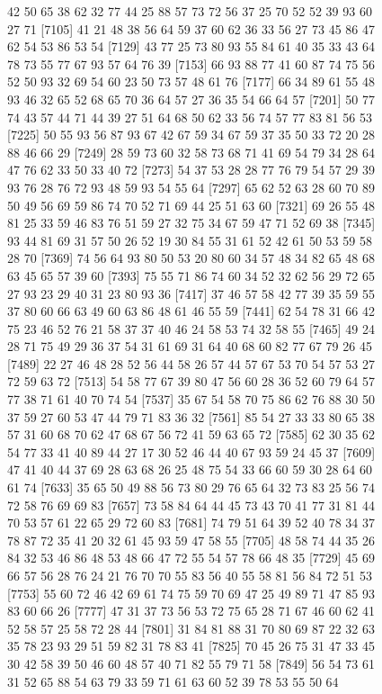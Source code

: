 \documentclass{article}
\begin{document}
\begin{figure}[H]
\begin{Schunk}
\begin{Soutput}
 [7081] 42 50 65 38 62 32 77 44 25 88 57 73 72 56 37 25 70 52 52 39 93 60 27 71
 [7105] 41 21 48 38 56 64 59 37 60 62 36 33 56 27 73 45 86 47 62 54 53 86 53 54
 [7129] 43 77 25 73 80 93 55 84 61 40 35 33 43 64 78 73 55 77 67 93 57 64 76 39
 [7153] 66 93 88 77 41 60 87 74 75 56 52 50 93 32 69 54 60 23 50 73 57 48 61 76
 [7177] 66 34 89 61 55 48 93 46 32 65 52 68 65 70 36 64 57 27 36 35 54 66 64 57
 [7201] 50 77 74 43 57 44 71 44 39 27 51 64 68 50 62 33 56 74 57 77 83 81 56 53
 [7225] 50 55 93 56 87 93 67 42 67 59 34 67 59 37 35 50 33 72 20 28 88 46 66 29
 [7249] 28 59 73 60 32 58 73 68 71 41 69 54 79 34 28 64 47 76 62 33 50 33 40 72
 [7273] 54 37 53 28 28 77 76 79 54 57 29 39 93 76 28 76 72 93 48 59 93 54 55 64
 [7297] 65 62 52 63 28 60 70 89 50 49 56 69 59 86 74 70 52 71 69 44 25 51 63 60
 [7321] 69 26 55 48 81 25 33 59 46 83 76 51 59 27 32 75 34 67 59 47 71 52 69 38
 [7345] 93 44 81 69 31 57 50 26 52 19 30 84 55 31 61 52 42 61 50 53 59 58 28 70
 [7369] 74 56 64 93 80 50 53 20 80 60 34 57 48 34 82 65 48 68 63 45 65 57 39 60
 [7393] 75 55 71 86 74 60 34 52 32 62 56 29 72 65 27 93 23 29 40 31 23 80 93 36
 [7417] 37 46 57 58 42 77 39 35 59 55 37 80 60 66 63 49 60 63 86 48 61 46 55 59
 [7441] 62 54 78 31 66 42 75 23 46 52 76 21 58 37 37 40 46 24 58 53 74 32 58 55
 [7465] 49 24 28 71 75 49 29 36 37 54 31 61 69 31 64 40 68 60 82 77 67 79 26 45
 [7489] 22 27 46 48 28 52 56 44 58 26 57 44 57 67 53 70 54 57 53 27 72 59 63 72
 [7513] 54 58 77 67 39 80 47 56 60 28 36 52 60 79 64 57 77 38 71 61 40 70 74 54
 [7537] 35 67 54 58 70 75 86 62 76 88 30 50 37 59 27 60 53 47 44 79 71 83 36 32
 [7561] 85 54 27 33 33 80 65 38 57 31 60 68 70 62 47 68 67 56 72 41 59 63 65 72
 [7585] 62 30 35 62 54 77 33 41 40 89 44 27 17 30 52 46 44 40 67 93 59 24 45 37
 [7609] 47 41 40 44 37 69 28 63 68 26 25 48 75 54 33 66 60 59 30 28 64 60 61 74
 [7633] 35 65 50 49 88 56 73 80 29 76 65 64 32 73 83 25 56 74 72 58 76 69 69 83
 [7657] 73 58 84 64 44 45 73 43 70 41 77 31 81 44 70 53 57 61 22 65 29 72 60 83
 [7681] 74 79 51 64 39 52 40 78 34 37 78 87 72 35 41 20 32 61 45 93 59 47 58 55
 [7705] 48 58 74 44 35 26 84 32 53 46 86 48 53 48 66 47 72 55 54 57 78 66 48 35
 [7729] 45 69 66 57 56 28 76 24 21 76 70 70 55 83 56 40 55 58 81 56 84 72 51 53
 [7753] 55 60 72 46 42 69 61 74 75 59 70 69 47 25 49 89 71 47 85 93 83 60 66 26
 [7777] 47 31 37 73 56 53 72 75 65 28 71 67 46 60 62 41 52 58 57 25 58 72 28 44
 [7801] 31 84 81 88 31 70 80 69 87 22 32 63 35 78 23 93 29 51 59 82 31 78 83 41
 [7825] 70 45 26 75 31 47 33 45 30 42 58 39 50 46 60 48 57 40 71 82 55 79 71 58
 [7849] 56 54 73 61 31 52 65 88 54 63 79 33 59 71 61 63 60 52 39 78 53 55 50 64

\end{Soutput}
\end{Schunk}
\end{figure}
\end{document}
